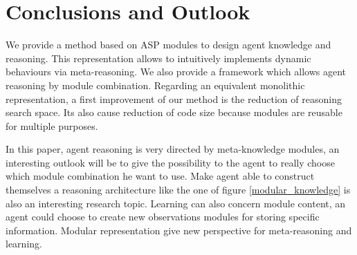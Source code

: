 \documentclass{aamas2012}
\begin{document}
\section{Conclusions and Outlook}

	We provide a method based on ASP modules to design agent knowledge and reasoning.
	This representation allows to intuitively implements dynamic behaviours via meta-reasoning.
	We also provide a framework which allows agent reasoning by module combination.
	Regarding an equivalent monolithic representation, a first improvement of our method is the reduction of reasoning search space.
	Its also cause reduction of code size because modules are reusable for multiple purposes.
	
	In this paper, agent reasoning is very directed by meta-knowledge modules, 
	an interesting outlook will be to give the possibility to the agent to really choose which module combination he want to use.
	Make agent able to construct themselves a reasoning architecture like the one of figure \ref{modular_knowledge} is also an interesting research topic.
	Learning can also concern module content, an agent could choose to create new observations modules for storing specific information.
	Modular representation give new perspective for meta-reasoning and learning.
%

%
%

\end{document}
